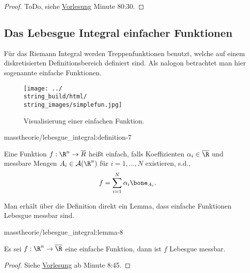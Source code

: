 \documentclass[letterpaper,10pt,german]{jupyterBook}
\begin{document}
\begin{proof}
 ToDo, siehe \href{https://www.fau.tv/clip/id/40563}{Vorlesung} Minute 80:30.
\end{proof}


\subsection{Das Lebesgue Integral einfacher Funktionen}
\label{\detokenize{masstheorie/lebesgue_integral:das-lebesgue-integral-einfacher-funktionen}}
\par
Für das Riemann Integral werden Treppenfunktionen benutzt, welche auf einem diskretisierten Definitionsbereich definiert sind. Als nalogon betrachtet man hier sogenannte einfache Funktionen.

\begin{figure}[htbp]
\centering


\noindent\texttt{[image: ../\\string\_build/html/\\string\_images/simplefun.jpg]}
\caption{Visualisierung einer einfachen Funktion.}\label{\detokenize{masstheorie/lebesgue_integral:fig-simplefun}}\end{figure}
\begin{definition}{}{masstheorie/lebesgue_integral:definition-7}



\par
Eine Funktion \(f:\R^n\to\overline{R}\) heißt einfach, falls Koeffizienten \(\alpha_i\in\overline{\R}\) und messbare Mengen \(A_i\in\mathcal{A}(\R^n)\) für \(i=1,\ldots,N\) existieren, s.d.,
\begin{align*}
f = \sum_{i=1}^N \alpha_i \bone_{A_i}.
\end{align*}\end{definition}

\par
Man erhält über die Definition direkt ein Lemma, dass einfache Funktionen Lebesgue messbar sind.
\begin{lemma}{}{masstheorie/lebesgue_integral:lemma-8}



\par
Es sei \(f:\R^n\to\overline{\R}\) eine einfache Funktion, dann ist \(f\) Lebesgue messbar.
\end{lemma}

\begin{proof}
 Siehe \href{https://www.fau.tv/clip/id/40589}{Vorlesung} ab Minute 8:45.
\end{proof}
\end{document}
